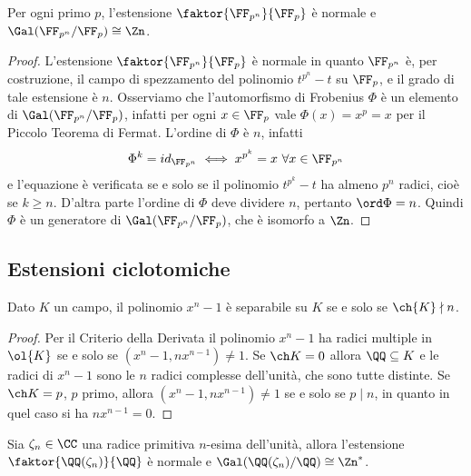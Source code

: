 \documentclass[11pt]{scrartcl}
\begin{document}
\begin{theorem}
    Per ogni primo $p$, l'estensione $\faktor{\FF_{p^n}}{\FF_p}$ è normale e 
    $\Gal(\FF_{p^n}/\FF_p) \cong \Zn$.
\end{theorem}

\begin{proof}
    L'estensione $\faktor{\FF_{p^n}}{\FF_p}$ è normale in quanto $\FF_{p^n}$
    è, per costruzione, il campo di spezzamento del polinomio $t^{p^n} - t$
    su $\FF_p$, e il grado di tale estensione è $n$. Osserviamo che l'automorfismo
    di Frobenius $\Phi$ è un elemento di $\Gal(\FF_{p^n}/\FF_p)$, infatti 
    per ogni $x \in \FF_p$ vale $\Phi(x) = x^p = x$ per il Piccolo Teorema di Fermat.
    L'ordine di $\Phi$ è $n$, infatti 
    \[
        \Phi^k = id_{\FF_{p^n}} \iff x^{p^k} = x~\forall x \in \FF_{p^n}
    \]
    e l'equazione è verificata se e solo se il polinomio $t^{p^k} - t$ ha almeno
    $p^n$ radici, cioè se $k \geq n$. D'altra parte l'ordine di $\Phi$ deve 
    dividere $n$, pertanto $\ord\Phi = n$. Quindi $\Phi$ è un generatore 
    di $\Gal(\FF_{p^n}/\FF_p)$, che è isomorfo a $\Zn$.
\end{proof}

\subsection{Estensioni ciclotomiche}

\begin{lemma}
    \label{lemma3.8}
    Dato $K$ un campo, il polinomio $x^n - 1$ è separabile su $K$ se e solo 
    se $\ch{K} \nmid n$.
\end{lemma}

\begin{proof}
    Per il Criterio della Derivata il polinomio $x^n - 1$ ha radici multiple
    in $\ol{K}$ se e solo se $(x^n - 1, nx^{n - 1}) \neq 1$. Se $\ch K = 0$
    allora $\QQ\subseteq K$ e le radici di 
    $x^n - 1$ sono le $n$ radici complesse dell'unità, che sono tutte distinte.
    Se $\ch K = p$, $p$ primo, allora $(x^n - 1, nx^{n - 1}) \neq 1$ se e solo
    se $p \mid n$, in quanto in quel caso si ha $nx^{n - 1} = 0$.
\end{proof}

\begin{theorem}
    \label{teorema3.9}
    Sia $\zeta_n\in \CC$ una radice primitiva $n$-esima dell'unità, allora
    l'estensione $\faktor{\QQ(\zeta_n)}{\QQ}$ è normale e 
    $\Gal(\QQ(\zeta_n)/\QQ)\cong \Zn^*$.
\end{theorem}
\end{document}
